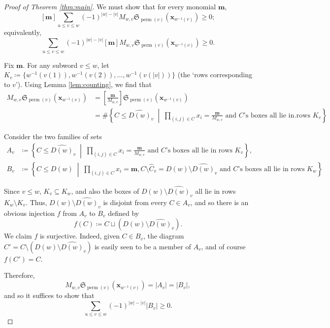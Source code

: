 \documentclass{amsart}
\theoremstyle{definition}
\theoremstyle{named}
\newcommand*{\Schub}{\mathfrak{S}}
\DeclareMathOperator*{\perm}{perm}
\begin{document}
\begin{proof}[Proof of Theorem \ref{thm:main}]
We must show that for every monomial $\mathbf{m}$,
\[
[\mathbf{m}]\sum_{u \le v \le w} (-1)^{\left|w\right|-\left|v\right|} M_{w, v} \Schub_{\perm(v)}(\mathbf{x}_{w^{-1}(v)}) \ge 0;
\]
equivalently,
\begin{equation}
\sum_{u \le v \le w} (-1)^{\left|w\right|-\left|v\right|} [\mathbf{m}] M_{w, v} \Schub_{\perm(v)}(\mathbf{x}_{w^{-1}(v)}) \ge 0.
\end{equation}

Fix $\mathbf{m}$. For any subword $v \le w$, let $K_v \coloneqq \{w^{-1}(v(1)), w^{-1}(v(2)), \dots, w^{-1}(v(\left|v\right|))\}$ (the `rows corresponding to $v$'). Using Lemma \ref{lem:counting}, we find that
\begin{align*}
[\mathbf{m}] M_{w, v} \Schub_{\perm(v)}(\mathbf{x}_{w^{-1}(v)}) &= \left[\frac{\mathbf{m}}{M_{w, v}}\right] \Schub_{\perm(v)}(\mathbf{x}_{w^{-1}(v)}) \\
&= \# \left\{ C \le \widehat{D(w)}_v \;\middle|\; \prod_{(i, j) \in C} x_i = \frac{\mathbf{m}}{M_{w, v}} \text{ and $C$'s boxes all lie in rows $K_v$} \right\}.
\end{align*}

Consider the two families of sets
\begin{align*}
A_v &\coloneqq \left\{ C \le \widehat{D(w)}_v \;\middle|\; \prod_{(i, j) \in C} x_i = \frac{\mathbf{m}}{M_{w, v}} \text{ and $C$'s boxes all lie in rows $K_v$} \right\}, \\
B_v &\coloneqq \left\{ C \le D(w) \;\middle|\; \prod_{(i, j) \in C} x_i = \mathbf{m}, C \setminus \widehat{C}_v = D(w) \setminus \widehat{D(w)}_v \text{ and $C$'s boxes all lie in rows $K_w$} \right\}.
\end{align*}

Since $v \le w$, $K_v \subseteq K_w$, and also the boxes of $D(w) \setminus \widehat{D(w)}_v$ all lie in rows $K_w \setminus K_v$. Thus, $D(w) \setminus \widehat{D(w)}_v$ is disjoint from every $C \in A_v$, and so there is an obvious injection $f$ from $A_v$ to $B_v$ defined by
\[
f(C) \coloneqq C \sqcup (D(w) \setminus \widehat{D(w)}_v).
\]
We claim $f$ is surjective. Indeed, given $C \in B_v$, the diagram $C' = C \setminus (D(w) \setminus \widehat{D(w)}_v)$ is easily seen to be a member of $A_v$, and of course $f(C') = C$.

Therefore,
\begin{equation}
[\mathbf{m}] M_{w, v} \Schub_{\perm(v)}(\mathbf{x}_{w^{-1}(v)}) = \left|A_v\right| = \left|B_v\right|,
\end{equation}
and so it suffices to show that
\begin{equation} \label{eqn:wts}
\sum_{u \le v \le w} (-1)^{\left|w\right|-\left|v\right|} \left|B_v\right| \ge 0.
\end{equation}


\end{proof}
\end{document}
